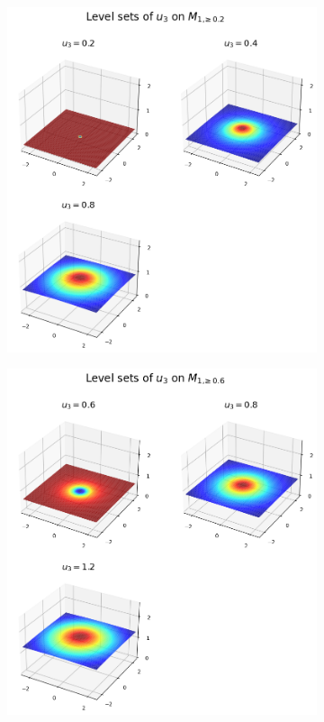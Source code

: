 \documentclass[titlepage,numbers=noenddot,headinclude,oneside,%
footinclude=true,cleardoublepage=empty,%
BCOR=5mm,paper=a4,fontsize=11pt,%
english,%
]{scrartcl}
\begin{document}
\begin{figure}


    \centering
    \begin{subfigure}{.45\textwidth}
        \includegraphics[width=\textwidth]{figures/level_sets_u3_modified_with_a_0.2.png}
    \end{subfigure}
    \begin{subfigure}{.45\textwidth}
        \includegraphics[width=\textwidth]{figures/level_sets_u3_modified_with_a_0.6.png}

\end{subfigure}
\end{figure}
\end{document}
